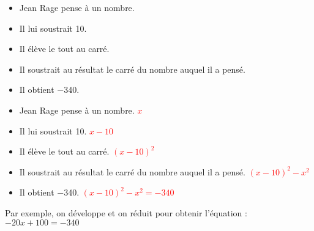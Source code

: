\begin{exercice*}
    \begin{itemize}
        \item Jean Rage pense à un nombre.
        \item Il lui soustrait \num{10}.
        \item Il élève le tout au carré.
        \item Il soustrait au résultat le carré du nombre auquel il a pensé.
        \item Il obtient \num{-340}.
    \end{itemize}
\end{exercice*}
\begin{corrige}
    \begin{itemize}
        \item Jean Rage pense à un nombre. \textcolor{red}{$x$}
        \item Il lui soustrait \num{10}. \textcolor{red}{$x-10$}
        \item Il élève le tout au carré. \textcolor{red}{$(x-10)^2$}
        \item Il soustrait au résultat le carré du nombre auquel il a pensé. \textcolor{red}{$(x-10)^2-x^2$}
        \item Il obtient \num{-340}. \textcolor{red}{$(x-10)^2-x^2=-340$}
    \end{itemize}    

    Par exemple, on développe et on réduit pour obtenir l'équation : $-20x+100=-340$

\end{corrige}
